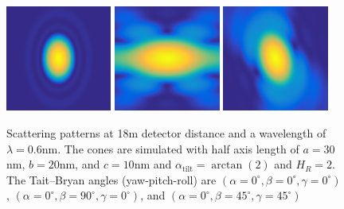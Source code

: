 \begin{figure}[htb]
\includegraphics[width=0.31\textwidth]{../images/form_factor/oriented_primitive_opbjects/cone_0_0_0_18m.png} \hfill
\includegraphics[width=0.31\textwidth]{../images/form_factor/oriented_primitive_opbjects/cone_0_90_0_18m.png}  \hfill \includegraphics[width=0.31\textwidth]{../images/form_factor/oriented_primitive_opbjects/cone_0_45_45_18m.png}
\caption{Scattering patterns at 18m detector distance and a wavelength of $\lambda=0.6$nm. The cones are simulated with half axis length of $a=30$nm, $b=20$nm, and $c=10$nm and $\alpha_\mathrm{tilt}=\arctan(2)$ and $H_R=2$. The Tait–Bryan angles (yaw-pitch-roll) are $(\alpha=0^\circ,\beta=0^\circ,\gamma=0^\circ)$, $(\alpha=0^\circ,\beta=90^\circ,\gamma=0^\circ)$, and $(\alpha=0^\circ,\beta=45^\circ,\gamma=45^\circ)$ }
\label{fig:opo_coneIQ2D}
\end{figure}

